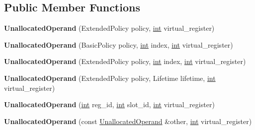 \subsection*{Public Member Functions}
\begin{DoxyCompactItemize}
\item 
\mbox{\label{classv8_1_1internal_1_1compiler_1_1UnallocatedOperand_a09ee7f2f68a6d1751078ff560a1ae955}} 
{\bfseries Unallocated\+Operand} (Extended\+Policy policy, \mbox{\hyperlink{classint}{int}} virtual\+\_\+register)
\item 
\mbox{\label{classv8_1_1internal_1_1compiler_1_1UnallocatedOperand_acdf0ed6d5291def55bcdec6ab7bb636a}} 
{\bfseries Unallocated\+Operand} (Basic\+Policy policy, \mbox{\hyperlink{classint}{int}} index, \mbox{\hyperlink{classint}{int}} virtual\+\_\+register)
\item 
\mbox{\label{classv8_1_1internal_1_1compiler_1_1UnallocatedOperand_a6beb02444339e3ccafb58871cdb4805e}} 
{\bfseries Unallocated\+Operand} (Extended\+Policy policy, \mbox{\hyperlink{classint}{int}} index, \mbox{\hyperlink{classint}{int}} virtual\+\_\+register)
\item 
\mbox{\label{classv8_1_1internal_1_1compiler_1_1UnallocatedOperand_a0e5021406571fee14a5af045172c1dc5}} 
{\bfseries Unallocated\+Operand} (Extended\+Policy policy, Lifetime lifetime, \mbox{\hyperlink{classint}{int}} virtual\+\_\+register)
\item 
\mbox{\label{classv8_1_1internal_1_1compiler_1_1UnallocatedOperand_a2cb78df70133d2bb2454de2028d62265}} 
{\bfseries Unallocated\+Operand} (\mbox{\hyperlink{classint}{int}} reg\+\_\+id, \mbox{\hyperlink{classint}{int}} slot\+\_\+id, \mbox{\hyperlink{classint}{int}} virtual\+\_\+register)
\item 
\mbox{\label{classv8_1_1internal_1_1compiler_1_1UnallocatedOperand_a9c0dff3fd2fbfb383be4d102570e5216}} 
{\bfseries Unallocated\+Operand} (const \mbox{\hyperlink{classv8_1_1internal_1_1compiler_1_1UnallocatedOperand}{Unallocated\+Operand}} \&other, \mbox{\hyperlink{classint}{int}} virtual\+\_\+register)

\end{DoxyCompactItemize}
